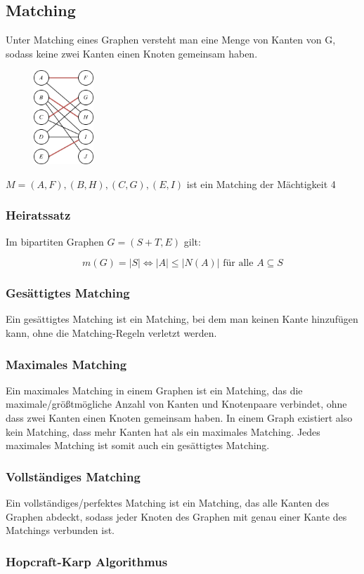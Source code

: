 \subsection{Matching}

Unter Matching eines Graphen versteht man eine Menge von Kanten von G, sodass keine zwei Kanten einen Knoten gemeinsam haben.

\begin{figure}[h]
\centering
\includegraphics[width=0.2\textwidth]{graphics/graph_matching.png}
\end{figure}

$M = {(A,F), (B,H), (C,G), (E,I)}$ ist ein Matching der Mächtigkeit 4

\subsubsection*{Heiratssatz}

Im bipartiten Graphen $G = (S + T, E)$ gilt:

$$
m(G) = |S| \Leftrightarrow |A| \leq |N (A)| \text{ für alle } A \subseteq S
$$

\subsubsection*{Gesättigtes Matching}

Ein gesättigtes Matching ist ein Matching, bei dem man keinen Kante hinzufügen kann, ohne die Matching-Regeln verletzt werden.

\subsubsection*{Maximales Matching}

Ein maximales Matching in einem Graphen ist ein Matching, das die maximale/größtmögliche Anzahl von Kanten und Knotenpaare verbindet, ohne dass zwei Kanten einen Knoten gemeinsam haben. In einem Graph existiert also kein Matching, dass mehr Kanten hat als ein maximales Matching. Jedes maximales Matching ist somit auch ein gesättigtes  Matching.

\subsubsection*{Vollständiges Matching}

Ein vollständiges/perfektes Matching ist ein Matching, das alle Kanten des Graphen abdeckt, sodass jeder Knoten des Graphen mit genau einer Kante des Matchings verbunden ist.

\subsubsection*{Hopcraft-Karp Algorithmus}


